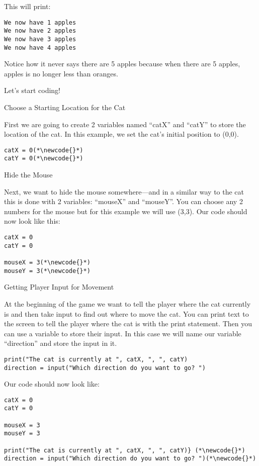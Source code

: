 \documentclass[12pt,oneside]{article}
\newcommand{\q}[1]{``#1''}
\newcommand{\subsectitle}[1]{
  \begin{flushleft}{\large#1}\end{flushleft}
}
\newcommand{\sectitle}[1]{
  \newpage
  \begin{flushleft}{\huge#1}\end{flushleft}
}
\newcommand{\newcode}[0]{\hfill<--}
\begin{document}
This will print:

\begin{lstlisting}
We now have 1 apples
We now have 2 apples
We now have 3 apples
We now have 4 apples
\end{lstlisting}

Notice how it never says there are 5 apples because when there are 5 apples, apples is no longer less than oranges.

\sectitle{Let's start coding!}

\begin{minipage}{\textwidth}
\subsectitle{Choose a Starting Location for the Cat}

First we are going to create 2 variables named \q{catX} and \q{catY} to store the location of the cat. In this example, we set the cat's initial position to (0,0).

\begin{lstlisting}
catX = 0(*\newcode{}*)
catY = 0(*\newcode{}*)
\end{lstlisting}
\end{minipage}

\begin{minipage}{\textwidth}
\subsectitle{Hide the Mouse}

Next, we want to hide the mouse somewhere---and in a similar way to the cat this is done with 2 variables: \q{mouseX} and \q{mouseY}. You can choose any 2 numbers for the mouse but for this example we will use (3,3). Our code should now look like this:

\begin{lstlisting}
catX = 0
catY = 0

mouseX = 3(*\newcode{}*)
mouseY = 3(*\newcode{}*)
\end{lstlisting}
\end{minipage}


\begin{minipage}{\textwidth}
\subsectitle{Getting Player Input for Movement}

At the beginning of the game we want to tell the player where the cat currently is and then take input to find out where to move the cat. You can print text to the screen to tell the player where the cat is with the print statement. Then you can use a variable to store their input. In this case we will name our variable \q{direction} and store the input in it.

\begin{lstlisting}
print("The cat is currently at ", catX, ", ", catY)
direction = input("Which direction do you want to go? ")
\end{lstlisting}

Our code should now look like:

\begin{lstlisting}
catX = 0
catY = 0

mouseX = 3
mouseY = 3

print("The cat is currently at ", catX, ", ", catY)} (*\newcode{}*)
direction = input("Which direction do you want to go? ")(*\newcode{}*)
\end{lstlisting}
\end{minipage}
\end{document}
